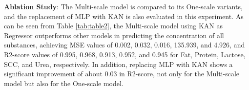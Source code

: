 \documentclass[10pt, a4paper, oneside]{article}
\begin{document}
\textbf{Ablation Study}: The Multi-scale model is compared to its One-scale variants, and the replacement of MLP with KAN is also evaluated in this experiment. As can be seen from Table \ref{tab:table2}, the Multi-scale model using KAN as Regressor outperforms other models in predicting the concentration of all substances, achieving MSE values of 0.002, 0.032, 0.016, 135.939, and 4.926, and R2-score values of 0.995, 0.968, 0.913, 0.952, and 0.945 for Fat, Protein, Lactose, SCC, and Urea, respectively. In addition, replacing MLP with KAN shows a significant improvement of about 0.03 in R2-score, not only for the Multi-scale model but also for the One-scale model.

\begin{table}[h]
\centering
{}
\end{table}
\end{document}
